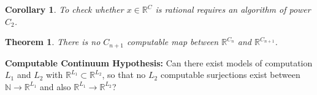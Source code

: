 \documentclass[11pt]{article}
\theoremstyle{plain}
\newtheorem{thm}[prop]{Theorem}
\newtheorem{cly}[prop]{Corollary}
\newcommand{\bb}[1]{\mathbb{#1}}
\newcommand{\bo}[1]{{\bf #1}}
\newcommand{\ra}{\rightarrow}
\begin{document}
\begin{cly}To check whether $x\in\bb R^C$ is rational requires an algorithm of power $C_2$. \end{cly}

\begin{thm}There is no $C_{n+1}$ computable map between $\bb R^{C_n}$ and $\bb R^{C_{n+1}}$.\end{thm}

\bo{Computable Continuum Hypothesis:} Can there exist models of computation $L_1$ and $L_2$ with $\bb R^{L_1}\subset\bb R^{L_2}$, so that no $L_2$ computable surjections exist between $\bb N\ra\bb R^{L_1}$ and also $\bb R^{L_1}\ra \bb R^{L_2}$?
\end{document}
